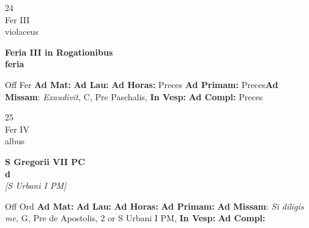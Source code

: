 \documentclass[10pt, openany]{book}
\begin{document}
    \begin{center}
        \begin{minipage}{3.5in}
            \vspace{2em}
            \begin{minipage}{0.5in}
                {\Huge 24} \\
                {\normalsize Fer III} \\
                {\normalsize violaceus}
            \end{minipage}
            \begin{minipage}{3.0in}
                \textbf{ \large Feria III in Rogationibus \\
                \textnormal{\normalsize feria}} \\ 
            \end{minipage}
            \begin{justify}Off Fer
                \textbf{Ad Mat: }
                \textbf{Ad Lau: }
                \textbf{Ad Horas: }Preces
                \textbf{Ad Primam: }Preces\textbf{Ad Missam}: \textit{Exaudivit,} C, Pre Paschalis,  
                \textbf{In Vesp: }
                \textbf{Ad Compl: }Preces
            \end{justify}
        \end{minipage}
    \end{center}

    \begin{center}
        \begin{minipage}{3.5in}
            \vspace{2em}
            \begin{minipage}{0.5in}
                {\Huge 25} \\
                {\normalsize Fer IV} \\
                {\normalsize albus}
            \end{minipage}
            \begin{minipage}{3.0in}
                \textbf{ \large S Gregorii VII PC \\
                \textnormal{\normalsize d}} \\ \textit{[S Urbani I PM]} \\ 
            \end{minipage}
            \begin{justify}Off Ord
                \textbf{Ad Mat: }
                \textbf{Ad Lau: }
                \textbf{Ad Horas: }
                \textbf{Ad Primam: }\textbf{Ad Missam}: \textit{Si diligis me,} G, Pre de Apostolis, 2 or S Urbani I PM,  
                \textbf{In Vesp: }
                \textbf{Ad Compl: }
            \end{justify}
        \end{minipage}
    \end{center}
\end{document}
